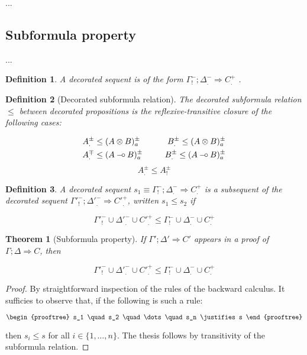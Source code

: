 \documentclass{article}
\newtheorem{theorem}{Theorem}
\newtheorem{definition}{Definition}
\def\limp {\mathbin{{-}\mkern-3.5mu{\circ}}}
\begin{document}
...

\subsection{Subformula property}

...


\begin{definition}
  A decorated sequent is of the form $\Gamma^-_! ; \Delta^-_. \Longrightarrow
  C^+_.$ .
\end{definition}

\begin{definition}[Decorated subformula relation]
  The decorated subformula relation $\leq$ between decorated propositions is the
  reflexive-transitive closure of the following cases:

  \begin{alignat*}{2}
    & A^{\pm}_{.} \leq (A \otimes B)_a^{\pm} \qquad & B^{\pm}_{.} \leq (A \otimes
    B)_a^{\pm} \\
    & A^{\mp}_{.} \leq (A \limp B)_a^{\pm} & B^{\pm}_{.} \leq (A \limp
    B)_a^{\pm}
  \end{alignat*}
  \[
    A^{\pm}_{.} \leq A^{\pm}_{!}
  \]
\end{definition}

\begin{definition}
  A decorated sequent $s_1 \equiv \Gamma^-_! ; \Delta^-_. \Longrightarrow C^+_.$
  is a subsequent of the decorated sequent
  $\Gamma'^-_! ; \Delta'^-_. \Longrightarrow C'^+_.$, written $s_1 \leq s_2$ if

  \[
    \Gamma'^-_! \cup \Delta'^-_. \cup C'^+_. \leq \Gamma^-_! \cup
    \Delta^-_. \cup C^+_.
  \]
\end{definition}

\begin{theorem}[Subformula property]
  If $\Gamma'; \Delta' \Longrightarrow C'$ appears in a proof of
  $\Gamma; \Delta \Longrightarrow C$, then

  \[
    \Gamma'^-_! \cup \Delta'^-_. \cup C'^+_. \leq \Gamma^-_! \cup
    \Delta^-_. \cup C^+_.
  \]
\end{theorem}
\begin{proof}
  By straightforward inspection of the rules of the backward calculus. It
  sufficies to observe that, if the following is such a rule:

  \[
    \begin{prooftree}
      s_1 \quad s_2 \quad \dots \quad s_n
      \justifies
      s
    \end{prooftree}
  \]

  then $s_i \leq s$ for all $i \in \{1, \dots, n\}$. The thesis follows by
  transitivity of the subformula relation.
\end{proof}
\end{document}
